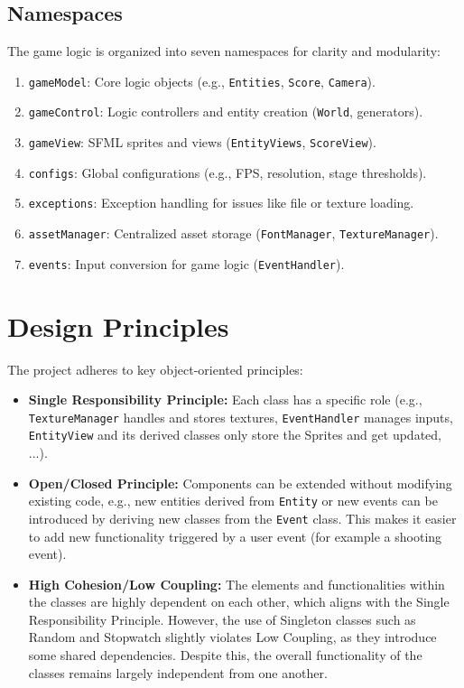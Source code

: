 \documentclass{article}
\begin{document}
\subsection*{Namespaces}
The game logic is organized into seven namespaces for clarity and modularity:
\begin{enumerate}
    \item \texttt{gameModel}: Core logic objects (e.g., \texttt{Entities}, \texttt{Score}, \texttt{Camera}).
    \item \texttt{gameControl}: Logic controllers and entity creation (\texttt{World}, generators).
    \item \texttt{gameView}: SFML sprites and views (\texttt{EntityViews}, \texttt{ScoreView}).
    \item \texttt{configs}: Global configurations (e.g., FPS, resolution, stage thresholds).
    \item \texttt{exceptions}: Exception handling for issues like file or texture loading.
    \item \texttt{assetManager}: Centralized asset storage (\texttt{FontManager}, \texttt{TextureManager}).
    \item \texttt{events}: Input conversion for game logic (\texttt{EventHandler}).
\end{enumerate}

\section*{Design Principles}
The project adheres to key object-oriented principles:
\begin{itemize}
    \item \textbf{Single Responsibility Principle:} Each class has a specific role (e.g., \texttt{TextureManager} handles and stores textures, \texttt{EventHandler} manages inputs, \texttt{EntityView} and its derived classes only store the Sprites and get updated, ...).
    \item \textbf{Open/Closed Principle:} Components can be extended without modifying existing code, e.g., new entities derived from \texttt{Entity} or new events can be introduced by deriving new classes from the \texttt{Event} class. This makes it easier to add new functionality triggered by a user event (for example a shooting event).
    \item \textbf{High Cohesion/Low Coupling:} The elements and functionalities within the classes are highly dependent on each other, which aligns with the Single Responsibility Principle. However, the use of Singleton classes such as Random and Stopwatch slightly violates Low Coupling, as they introduce some shared dependencies. Despite this, the overall functionality of the classes remains largely independent from one another.

\end{itemize}
\newpage
\end{document}
